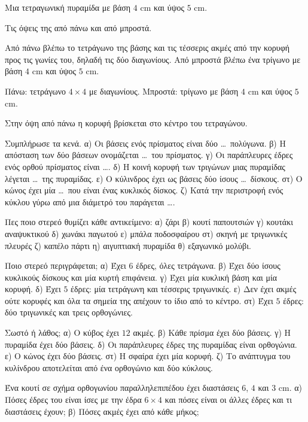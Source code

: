 \tixero Μια τετραγωνική πυραμίδα με βάση $4$ cm και ύψος $5$ cm.\par
\tithelo Τις όψεις της από πάνω και από μπροστά.\par
\possindeo Από πάνω βλέπω το τετράγωνο της βάσης και τις τέσσερις ακμές από την κορυφή προς τις γωνίες του, δηλαδή τις δύο διαγωνίους. Από μπροστά βλέπω ένα τρίγωνο με βάση $4$ cm και ύψος $5$ cm.\par
\apantisi Πάνω: τετράγωνο $4\times4$ με διαγωνίους. Μπροστά: τρίγωνο με βάση $4$ cm και ύψος $5$ cm.\par
\elegxos Στην όψη από πάνω η κορυφή βρίσκεται στο κέντρο του τετραγώνου.



\ex Συμπλήρωσε τα κενά. α) Οι βάσεις ενός πρίσματος είναι δύο \dots\ πολύγωνα. \quad β) Η απόσταση των δύο βάσεων ονομάζεται \dots\ του πρίσματος. \quad γ) Οι παράπλευρες έδρες ενός ορθού πρίσματος είναι \dots. \quad δ) Η κοινή κορυφή των τριγώνων μιας πυραμίδας λέγεται \dots\ της πυραμίδας. \quad ε) Ο κύλινδρος έχει ως βάσεις δύο ίσους \dots\ δίσκους. \quad στ) Ο κώνος έχει μία \dots\ που είναι ένας κυκλικός δίσκος. \quad ζ) Κατά την περιστροφή ενός κύκλου γύρω από μια διάμετρό του παράγεται \dots.

\ex Πες ποιο στερεό θυμίζει κάθε αντικείμενο: α) ζάρι \quad β) κουτί παπουτσιών \quad γ) κουτάκι αναψυκτικού \quad δ) χωνάκι παγωτού \quad ε) μπάλα ποδοσφαίρου \quad στ) σκηνή με τριγωνικές πλευρές \quad ζ) καπέλο πάρτι \quad η) αιγυπτιακή πυραμίδα \quad θ) εξαγωνικό μολύβι.

\ex Ποιο στερεό περιγράφεται; α) Έχει $6$ έδρες, όλες τετράγωνα. \quad β) Έχει δύο ίσους κυκλικούς δίσκους και μία κυρτή επιφάνεια. \quad γ) Έχει μία κυκλική βάση και μία κορυφή. \quad δ) Έχει $5$ έδρες: μία τετράγωνη και τέσσερις τριγωνικές. \quad ε) Δεν έχει ακμές ούτε κορυφές και όλα τα σημεία της απέχουν το ίδιο από το κέντρο. \quad στ) Έχει $5$ έδρες: δύο τριγωνικές και τρεις ορθογώνιες.

\ex Σωστό ή λάθος; α) Ο κύβος έχει $12$ ακμές. \quad β) Κάθε πρίσμα έχει δύο βάσεις. \quad γ) Η πυραμίδα έχει δύο βάσεις. \quad δ) Οι παράπλευρες έδρες της πυραμίδας είναι ορθογώνια. \quad ε) Ο κώνος έχει δύο βάσεις. \quad στ) Η σφαίρα έχει μία κορυφή. \quad ζ) Το ανάπτυγμα του κυλίνδρου αποτελείται από ένα ορθογώνιο και δύο κύκλους.

\ex Ένα κουτί σε σχήμα ορθογωνίου παραλληλεπιπέδου έχει διαστάσεις $6$, $4$ και $3$ cm. α) Πόσες έδρες του είναι ίσες με την έδρα $6\times4$ και πόσες είναι οι άλλες έδρες και τι διαστάσεις έχουν; β) Πόσες ακμές έχει από κάθε μήκος;

